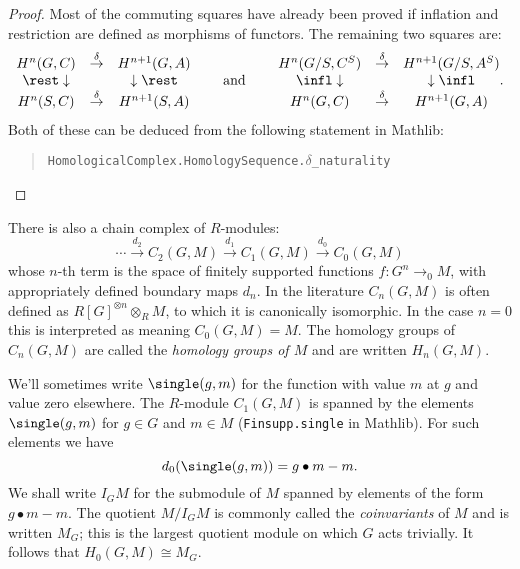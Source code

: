 \begin{proof}
	\leanok
	Most of the commuting squares have already been proved if
	inflation and restriction are defined as morphisms of functors.
	The remaining two squares are:
	\[
  	\begin{matrix}
			H^n(G,C)& \stackrel{\delta}\to& H^{n+1}(G,A)\\
			\rest\downarrow&&\downarrow\rest \\
			H^n(S,C)& \stackrel{\delta} \to& H^{n+1}(S,A)
		\end{matrix}
		\qquad\textrm{ and }\qquad
		\begin{matrix}
			H^n(G/S,C^S)& \stackrel{\delta}\to& H^{n+1}(G/S,A^S)\\
			\infl\downarrow&&\downarrow\infl\\
			H^n(G,C)& \stackrel{\delta}\to& H^{n+1}(G,A)
		\end{matrix} .
  \]
	Both of these can be deduced from the following statement in Mathlib:
	\begin{quote}
		\texttt{HomologicalComplex.HomologySequence.$\delta$\_naturality}
	\end{quote}
\end{proof}

\begin{definition} \label{def:group homology}
	\mathlibok
	There is also a chain complex of $R$-modules:
	\[
		\cdots \stackrel{d_2}\to C_2(G,M) \stackrel{d_1}\to C_1(G,M) \stackrel{d_0}\to C_0(G,M)
	\]
	whose $n$-th term is the space of finitely supported functions
	$f : G^n \to_0 M$, with appropriately defined boundary maps $d_n$.
	In the literature $C_n(G,M)$ is often defined as $R[G]^{\otimes n} \otimes_R M$, to which it is
	canonically isomorphic.
	In the case $n=0$ this is interpreted as meaning $C_0(G,M) = M$.
	The homology groups of $C_n(G,M)$ are called the \emph{homology groups of $M$}
	and are written $H_n(G,M)$.
\end{definition}

\begin{example} \label{eg:homology 0}
	We'll sometimes write $\single(g,m)$ for the function with value $m$ at $g$ and value
	zero elsewhere. The $R$-module $C_1(G,M)$ is spanned by the elements $\single(g,m)$
	for $g \in G$ and $m \in M$ (\texttt{Finsupp.single} in Mathlib).
	For such elements we have
	\[
		d_0(\single(g,m))
		=
		g \bullet m - m.
	\]
	We shall write $I_G M$ for the submodule of $M$ spanned by elements of the form $g \bullet m - m$.
	The quotient $M / I_GM$ is commonly called the \emph{coinvariants} of $M$ and is written $M_G$;
	this is the largest	quotient module on which $G$ acts trivially.
	It follows that $H_0(G,M) \cong M_G$.
\end{example}

